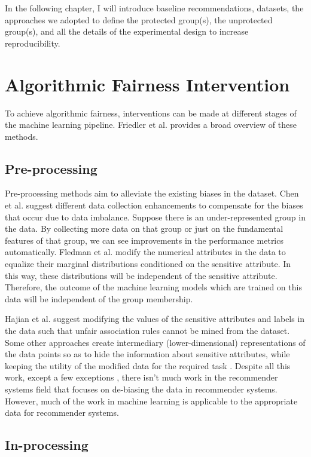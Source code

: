     In the following chapter, I will introduce baseline recommendations, datasets, the approaches we adopted to define the protected group(s), the unprotected group(s), and all the details of the experimental design to increase reproducibility.
    

\section{Algorithmic Fairness Intervention}
    To achieve algorithmic fairness, interventions can be made at different stages of the machine learning pipeline. Friedler et al. \cite{Friedler2019} provides a broad overview of these methods.

    \subsection{Pre-processing}
        Pre-processing methods aim to alleviate the existing biases in the dataset. Chen et al. \cite{chen2018why} suggest different data collection enhancements to compensate for the biases that occur due to data imbalance. Suppose there is an under-represented group in the data. By collecting more data on that group or just on the fundamental features of that group, we can see improvements in the performance metrics automatically. Fledman et al. \cite{Feldman2015} modify the numerical attributes in the data to equalize their marginal distributions conditioned on the sensitive attribute. In this way, these distributions will be independent of the sensitive attribute. Therefore, the outcome of the machine learning models which are trained on this data will be independent of the group membership. 
        
        Hajian et al. \cite{hajian2012methodology} suggest modifying the values of the sensitive attributes and labels in the data such that unfair association rules cannot be mined from the dataset. Some other approaches create intermediary (lower-dimensional) representations of the data points so as to hide the information about sensitive attributes, while keeping the utility of the modified data for the required task \cite{zemel2013learning,lahoti2019ifair}. Despite all this work, except a few exceptions \cite{ekstrand2018all}, there isn't much work in the recommender systems field that focuses on de-biasing the data in recommender systems. However, much of the work in machine learning is applicable to the appropriate data for recommender systems. 


    \subsection{In-processing}

